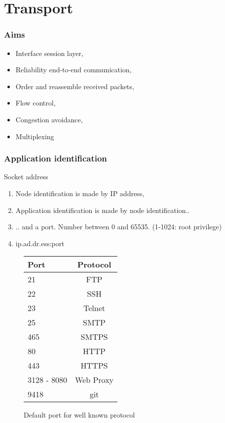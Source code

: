\section{Transport}
  \begin{frame}
    \frametitle{Aims}
      \begin{itemize}
        \item Interface session layer,\pause
        \item Reliability end-to-end communication,\pause
        \item Order and reassemble received packets,\pause
        \item Flow control,\pause
        \item Congestion avoidance,\pause
        \item Multiplexing
      \end{itemize}
  \end{frame}

  \begin{frame}
    \frametitle{Application identification}
    \begin{block}{Socket address}
      \begin{enumerate}
        \item Node identification is made by IP address,\pause
        \item Application identification is made by node identification..\pause
        \item .. and a port. Number between 0 and 65535. (1-1024: root privilege) \pause
        \item \begin{center} ip.ad.dr.ess:port \end{center}
      \end{enumerate}
    \end{block}
  \end{frame}

  \begin{frame}
    \begin{figure}
      \centering
      \begin{tabular}{l|c}
        Port & Protocol \\ \hline
        21 & FTP \\ \hline
        22 & SSH \\ \hline
        23 & Telnet \\ \hline
        25 & SMTP \\ \hline
        465 & SMTPS \\ \hline
        80 & HTTP \\ \hline
        443 & HTTPS \\ \hline
        3128 - 8080 & Web Proxy \\ \hline
        9418 & git \\ \hline
      \end{tabular}
      \caption{Default port for well known protocol}
      \label{fig:def-port}
    \end{figure}
  \end{frame}


